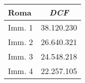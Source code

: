 \begin{tabular}[c]{|l||c|}
\hline
{\bfseries Roma} & {\bfseries \textit{DCF}} \\
\hline \hline
Imm. 1 & 38.120.230 \\
\hline
Imm. 2 & 26.640.321 \\
\hline
Imm. 3 & 24.548.218 \\
\hline
Imm. 4 & 22.257.105 \\ 
\hline
\end{tabular}